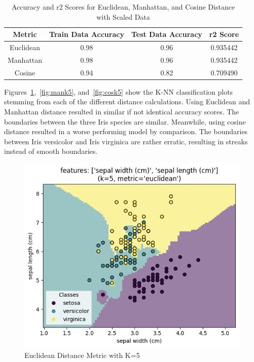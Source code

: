 \documentclass[journal]{IEEEtran}
\begin{document}
\begin{table}[h!]
\centering
\begin{tabular}{ c | c c c }
Metric & Train Data Accuracy & Test Data Accuracy & r2 Score \\
\hline
Euclidean & 0.98 & 0.96 & 0.935442 \\
Manhattan & 0.98 & 0.96 & 0.935442 \\
Cosine & 0.94 & 0.82 & 0.709490 \\
\end{tabular}
\caption{Accuracy and r2 Scores for Euclidean, Manhattan, and Cosine Distance with Scaled Data}
\label{table:accur5scaled}
\end{table}

Figures~\ref{fig:euclk5},~\ref{fig:mank5}, and~\ref{fig:cosk5} show the K-NN classification plots stemming from each of the different distance calculations. Using Euclidean and Manhattan distance resulted in similar if not identical accuracy scores. The boundaries between the three Iris species are similar. Meanwhile, using cosine distance resulted in a worse performing model by comparison. The boundaries between Iris versicolor and Iris virginica are rather erratic, resulting in streaks instead of smooth boundaries.

\begin{figure}[h!]
\includegraphics[scale=0.4]{euclidean_k5.png}
\centering
\caption{Euclidean Distance Metric with K=5}
\label{fig:euclk5}
\end{figure}
\end{document}
